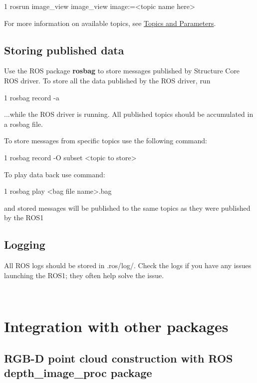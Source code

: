 \begin{DoxyCode}
1 rosrun image\_view image\_view image:=<topic name here>
\end{DoxyCode}


For more information on available topics, see \hyperlink{ros_main_features_published_topics}{Topics and Parameters}.

\hypertarget{ros_start_store_data}{}\subsection{Storing published data}\label{ros_start_store_data}
Use the R\+OS package {\bfseries rosbag} to store messages published by Structure Core R\+OS driver. To store all the data published by the R\+OS driver, run


\begin{DoxyCode}
1 rosbag record -a
\end{DoxyCode}


...while the R\+OS driver is running. All published topics should be accumulated in a rosbag file.

To store messages from specific topics use the following command\+:


\begin{DoxyCode}
1 rosbag record -O subset <topic to store>
\end{DoxyCode}


To play data back use command\+:


\begin{DoxyCode}
1 rosbag play <bag file name>.bag
\end{DoxyCode}


and stored messages will be published to the same topics as they were published by the R\+O\+S1\hypertarget{ros_start_logging}{}\subsection{Logging}\label{ros_start_logging}
All R\+OS logs should be stored in {\ttfamily .ros/log/}. Check the logs if you have any issues launching the R\+O\+S1; they often help solve the issue.

~\newline
\hypertarget{ros_start_integration}{}\section{Integration with other packages}\label{ros_start_integration}
\subsection*{R\+G\+B-\/D point cloud construction with R\+OS depth\+\_\+image\+\_\+proc package}

